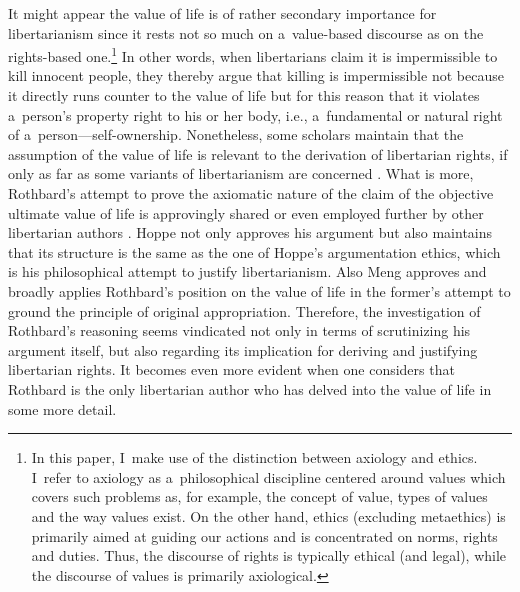 It might appear the value of life is of rather secondary importance for libertarianism since it rests not so much on a~value-based discourse as on the rights-based one.\footnote{In this paper, I~make use of the distinction between axiology and ethics. I~refer to axiology as a~philosophical discipline centered around values which covers such problems as, for example, the concept of value, types of values and the way values exist. On the other hand, ethics (excluding metaethics) is primarily aimed at guiding our actions and is concentrated on norms, rights and duties. Thus, the discourse of rights is typically ethical (and legal), while the discourse of values is primarily axiological.} In other words, when libertarians claim it is impermissible to kill innocent people, they thereby argue that killing is impermissible not because it directly runs counter to the value of life but for this reason that it violates a~person's property right to his or her body, i.e., a~fundamental or natural right of a~person---self-ownership. Nonetheless, some scholars maintain that the assumption of the value of life is relevant to the derivation of libertarian rights, if only as far as some variants of libertarianism are concerned 
\parencites[see][p.115]{}[][pp.xxxiv–xxxv]{}[][p.14]{}[][]{}[][]{}[][pp.60–61]{}[][]{}[][p.134ff]{}[][p.29]{}[][p.217]{}[][p.294]{}. %
 What is more, Rothbard's attempt to prove the axiomatic nature of the claim of the objective ultimate value of life is approvingly shared or even employed further by other libertarian authors 
\parencites[see][]{}[][pp.xxxiv–xxxv]{}[][]{}[][]{}. %
 Hoppe 
\parencite*[][p.66]{} %
 not only approves his argument but also maintains that its structure is the same as the one of Hoppe's argumentation ethics, which is his philosophical attempt to justify libertarianism. Also Meng 
\parencite*[][]{} %
 approves and broadly applies Rothbard's position on the value of life in the former's attempt to ground the principle of original appropriation. Therefore, the investigation of Rothbard's reasoning seems vindicated not only in terms of scrutinizing his argument itself, but also regarding its implication for deriving and justifying libertarian rights. It becomes even more evident when one considers that Rothbard is the only libertarian author who has delved into the value of life in some more detail.




